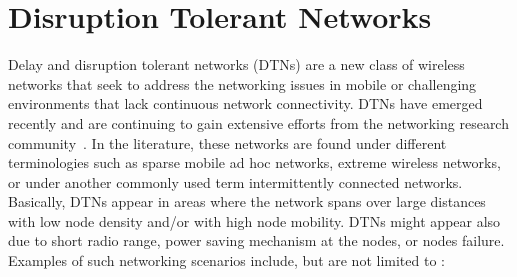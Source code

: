 \section{Disruption Tolerant Networks}

Delay and disruption tolerant networks (DTNs) are a new class of wireless networks that seek to address the networking issues in mobile or challenging environments that lack
continuous network connectivity. DTNs have emerged recently and are continuing to gain extensive efforts from the networking research community~\cite{Bundle,fall03,dtnrg}. In the literature, these networks are found under different terminologies such as sparse mobile ad hoc networks, extreme wireless networks, or under another commonly used term intermittently connected networks. Basically, DTNs appear in areas where the network spans over large distances with low node density and/or with high node mobility. DTNs might appear also due to short radio range, power saving mechanism at the nodes, or nodes failure. Examples of such networking scenarios include, but are not limited to :

